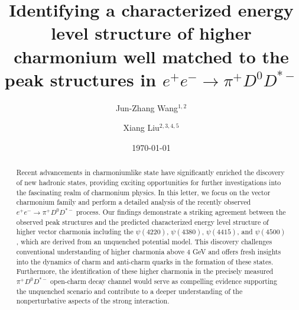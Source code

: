 \documentclass[prl,twocolumn,floatfix,amsmath,nofootinbib,amssymb,floatfix]{revtex4}
\begin{document}


\title{Identifying a characterized energy level structure of higher charmonium well matched to the peak structures in $e^+e^-\to \pi^+ D^0 D^{*-}$}
\author{Jun-Zhang Wang$^{1,2}$}
\author{Xiang Liu$^{2,3,4,5}$}





\date{\today}

\begin{abstract}

Recent advancements in charmoniumlike state have significantly enriched the discovery of new hadronic states, providing exciting opportunities for further investigations into the fascinating realm of charmonium physics. In this letter, we focus on the vector charmonium family and perform a detailed analysis of the recently observed $e^+e^-\to \pi^+ D^0 D^{*-}$ process. Our findings demonstrate a striking agreement between the observed peak structures and the predicted characterized energy level structure of higher vector charmonia including the $\psi(4220)$, $\psi(4380)$, $\psi(4415)$, and $\psi(4500)$, which are derived from an unquenched potential model. This discovery challenges conventional understanding of higher charmonia above 4 GeV and offers fresh insights into the dynamics of charm and anti-charm quarks in the formation of these states. Furthermore, the identification of these higher charmonia in the precisely measured $\pi^+ D^0D^{*-}$ open-charm decay channel would serve as compelling evidence supporting the unquenched scenario and contribute to a deeper understanding of the nonperturbative aspects of the strong interaction.
\end{abstract}
\end{document}
